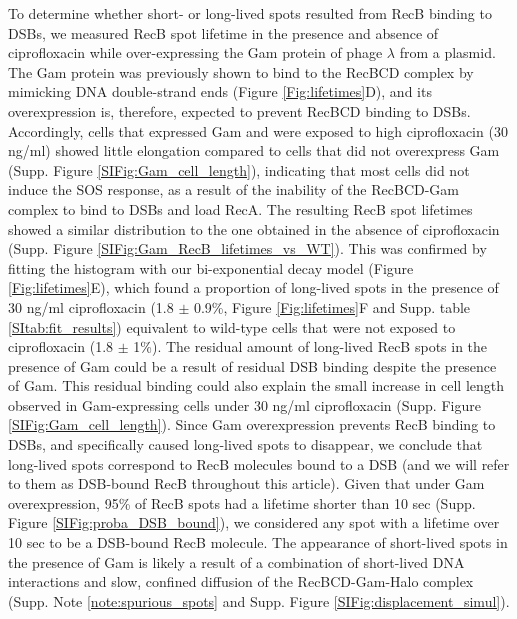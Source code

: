 To determine whether short- or long-lived spots resulted from RecB binding to DSBs, we measured RecB spot lifetime in the presence and absence of ciprofloxacin while over-expressing the Gam protein of phage $\lambda$ from a plasmid. The Gam protein was previously shown to bind to the RecBCD complex by mimicking DNA double-strand ends \cite{Wilkinson2016} (Figure \ref{Fig:lifetimes}D), and its overexpression is, therefore, expected to prevent RecBCD binding to DSBs. Accordingly, cells that expressed Gam and were exposed to high ciprofloxacin (30 ng/ml) showed little elongation compared to cells that did not overexpress Gam (Supp. Figure \ref{SIFig:Gam_cell_length}), indicating that most cells did not induce the SOS response, as a result of the inability of the RecBCD-Gam complex to bind to DSBs and load RecA. The resulting RecB spot lifetimes showed a similar distribution to the one obtained in the absence of ciprofloxacin (Supp. Figure \ref{SIFig:Gam_RecB_lifetimes_vs_WT}). This was confirmed by fitting the histogram with our bi-exponential decay model (Figure \ref{Fig:lifetimes}E), which found a proportion of long-lived spots in the presence of 30 ng/ml ciprofloxacin (1.8 $\pm$ 0.9\%, Figure \ref{Fig:lifetimes}F and Supp. table \ref{SItab:fit_results}) equivalent to wild-type cells that were not exposed to ciprofloxacin (1.8 $\pm$ 1\%). The residual amount of long-lived RecB spots in the presence of Gam could be a result of residual DSB binding despite the presence of Gam. This residual binding could also explain the small increase in cell length observed in Gam-expressing cells under 30 ng/ml ciprofloxacin (Supp. Figure \ref{SIFig:Gam_cell_length}). Since Gam overexpression prevents RecB binding to DSBs, and specifically caused long-lived spots to disappear, we conclude that long-lived spots correspond to RecB molecules bound to a DSB (and we will refer to them as DSB-bound RecB throughout this article). Given that under Gam overexpression, 95\% of RecB spots had a lifetime shorter than 10 sec (Supp. Figure \ref{SIFig:proba_DSB_bound}), we considered any spot with a lifetime over 10 sec to be a DSB-bound RecB molecule. The appearance of short-lived spots in the presence of Gam is likely a result of a combination of short-lived DNA interactions and slow, confined diffusion of the RecBCD-Gam-Halo complex (Supp. Note \ref{note:spurious_spots} and Supp. Figure \ref{SIFig:displacement_simul}).


